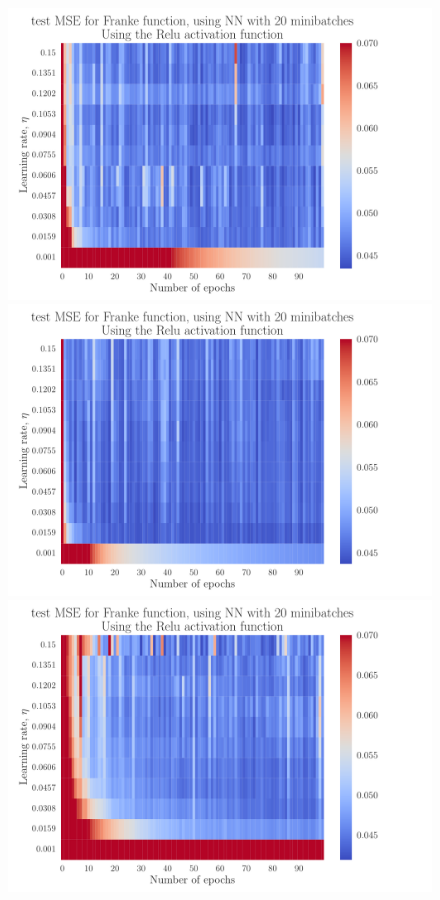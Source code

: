 \documentclass[12pt]{extarticle}
\begin{document}
\begin{figure}[h]
	\includegraphics[width=\linewidth]{../output/plots/NN_Franke__epochs_eta__test_MSE__relu__375043.pdf}
	\endminipage\hfill
	\includegraphics[width=\linewidth]{../output/plots/NN_Franke__epochs_eta__test_MSE__relu__705262.pdf}
	\endminipage\hfill
	\includegraphics[width=\linewidth]{../output/plots/NN_Franke__epochs_eta__test_MSE__relu__45014.pdf}

\end{figure}
\end{document}
